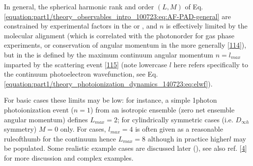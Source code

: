 \documentclass[letterpaper,table,10pt,english]{jupyterBook}
\begin{document}
\sphinxAtStartPar
In general, the spherical harmonic rank and order \((L,M)\) of Eq. \eqref{equation:part1/theory_observables_intro_100723:eq:AF-PAD-general} are constrained by experimental factors in the {\hyperref[\detokenize{backmatter/glossary:term-LF}]{}} or {\hyperref[\detokenize{backmatter/glossary:term-AF}]{}}, and \(n\) is effectively limited by the molecular alignment (which is correlated with the photon\sphinxhyphen{}order for gas phase experiments, or conservation of angular momentum in the {\hyperref[\detokenize{backmatter/glossary:term-LF}]{}} more generally {[}\hyperlink{cite.backmatter/bibliography:id976}{114}{]}), but in the {\hyperref[\detokenize{backmatter/glossary:term-MF}]{}} is defined by the maximum continuum angular momentum \(n=l_{max}\) imparted by the scattering event {[}\hyperlink{cite.backmatter/bibliography:id580}{115}{]} (note lower\sphinxhyphen{}case \(l\) here refers specifically to the continuum photoelectron wavefunction, see Eq. \eqref{equation:part1/theory_photoionization_dynamics_140723:eq:elwf}).

\sphinxAtStartPar
For basic cases these limits may be low: for instance, a simple 1\sphinxhyphen{}photon photoionization event (\(n=1\)) from an isotropic ensemble (zero net ensemble angular momentum) defines \(L_{max}=2\); for cylindrically symmetric cases (i.e. \(D_{\infty h}\) symmetry) \(M=0\) only. For {\hyperref[\detokenize{backmatter/glossary:term-MF}]{}} cases, \(l_{max}=4\) is often given as a reasonable rule\sphinxhyphen{}of\sphinxhyphen{}thumb for the continuum \sphinxhyphen{} hence \(L_{max}=8\) \sphinxhyphen{} although in practice higher\sphinxhyphen{}\(l\) may be populated. Some realistic example cases are discussed later ({\hyperref[\detokenize{part2/extracting_matrix_elements_overview_270423:chpt-extracting-matrix-elements-overview}]{}}), see also ref. {[}\hyperlink{cite.backmatter/bibliography:id675}{4}{]} for more discussion and complex examples.
\end{document}
